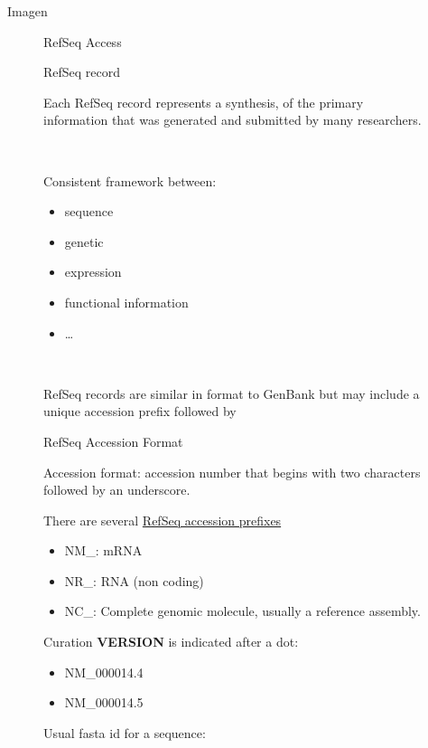 \begin{frame}{Imagen}
\begin{figure}[htbp]
\begin{frame}{RefSeq Access}
\end{frame}

\begin{frame}{RefSeq record}

Each RefSeq record represents a synthesis, of the primary information
that was generated and submitted by many researchers.

~

Consistent framework between:

\begin{itemize}
\itemsep1pt\parskip0pt
\item
  sequence
\item
  genetic
\item
  expression
\item
  functional information
\item
  \ldots{}
\end{itemize}

~

RefSeq records are similar in format to GenBank but may include a unique
accession prefix followed by

\end{frame}

\begin{frame}[fragile]{RefSeq Accession Format}

Accession format: accession number that begins with two characters
followed by an underscore.

There are several
\href{http://www.ncbi.nlm.nih.gov/books/NBK21091/table/ch18.T.refseq_accession_numbers_and_mole/?report=objectonly}{RefSeq
accession prefixes}

\begin{itemize}
\itemsep1pt\parskip0pt
\item
  NM\_: mRNA\\
\item
  NR\_: RNA (non coding)
\item
  NC\_: Complete genomic molecule, usually a reference assembly.
\end{itemize}

Curation \textbf{VERSION} is indicated after a dot:

\begin{itemize}
\itemsep1pt\parskip0pt
\item
  NM\_000014.4
\item
  NM\_000014.5
\end{itemize}

Usual fasta id for a sequence:


\end{frame}
\end{figure}
\end{frame}
